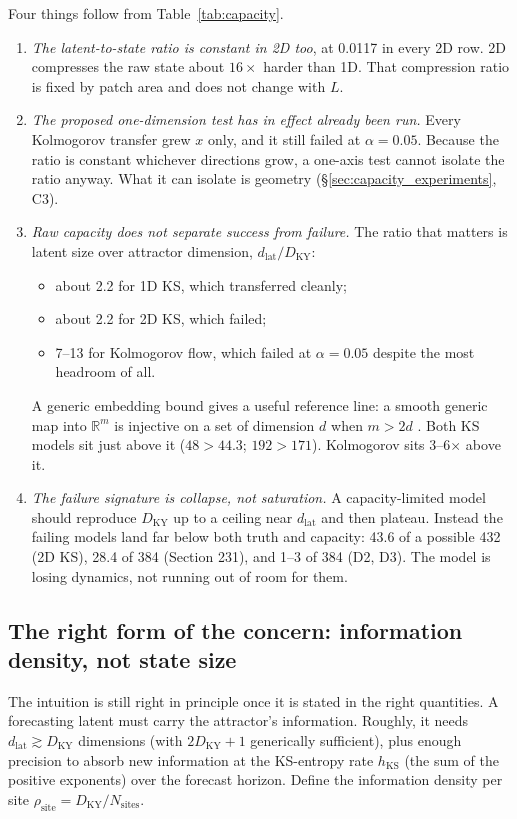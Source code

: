 \documentclass[11pt]{article}
\begin{document}
Four things follow from Table~\ref{tab:capacity}.
\begin{enumerate}[leftmargin=*]
\item \emph{The latent-to-state ratio is constant in 2D too}, at 0.0117
  in every 2D row. 2D compresses the raw state about $16\times$ harder
  than 1D. That compression ratio is fixed by patch area and does not
  change with $L$.
\item \emph{The proposed one-dimension test has in effect already been
  run.} Every Kolmogorov transfer grew $x$ only, and it still failed at
  $\alpha{=}0.05$. Because the ratio is constant whichever directions
  grow, a one-axis test cannot isolate the ratio anyway. What it can
  isolate is geometry (\S\ref{sec:capacity_experiments}, C3).
\item \emph{Raw capacity does not separate success from failure.} The
  ratio that matters is latent size over attractor dimension,
  $d_{\mathrm{lat}}/D_{\mathrm{KY}}$:
  \begin{itemize}[leftmargin=*]
  \item about 2.2 for 1D KS, which transferred cleanly;
  \item about 2.2 for 2D KS, which failed;
  \item 7--13 for Kolmogorov flow, which failed at $\alpha{=}0.05$
    despite the most headroom of all.
  \end{itemize}
  A generic embedding bound gives a useful reference line: a smooth
  generic map into $\mathbb{R}^m$ is injective on a set of dimension $d$
  when $m>2d$ \cite{embedology1991}. Both KS models sit just above it
  ($48 > 44.3$; $192 > 171$). Kolmogorov sits 3--6$\times$ above it.
\item \emph{The failure signature is collapse, not saturation.} A
  capacity-limited model should reproduce $D_{\mathrm{KY}}$ up to a
  ceiling near $d_{\mathrm{lat}}$ and then plateau. Instead the failing
  models land far below both truth and capacity: 43.6 of a possible 432
  (2D KS), 28.4 of 384 (Section 231), and 1--3 of 384 (D2, D3). The model
  is losing dynamics, not running out of room for them.
\end{enumerate}

\subsection{The right form of the concern: information density, not state size}

The intuition is still right in principle once it is stated in the right
quantities. A forecasting latent must carry the attractor's information.
Roughly, it needs $d_{\mathrm{lat}}\gtrsim D_{\mathrm{KY}}$ dimensions
(with $2D_{\mathrm{KY}}{+}1$ generically sufficient), plus enough
precision to absorb new information at the KS-entropy rate $h_{\mathrm{KS}}$
(the sum of the positive exponents) over the forecast horizon. Define the
information density per site
$\rho_{\mathrm{site}} = D_{\mathrm{KY}}/N_{\mathrm{sites}}$.
\end{document}
